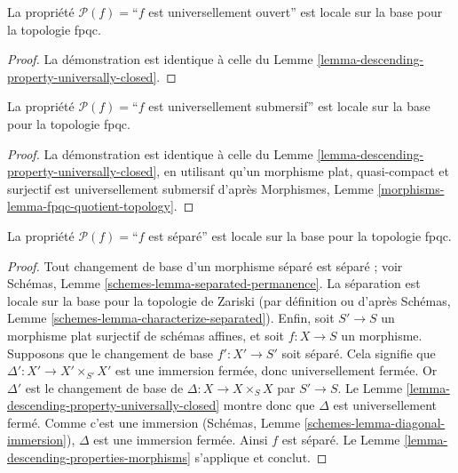 \begin{lemma}
\label{lemma-descending-property-universally-open}
La propriété $\mathcal{P}(f) =$``$f$ est universellement ouvert'' est locale
sur la base pour la topologie fpqc.
\end{lemma}

\begin{proof}
La démonstration est identique à celle du
Lemme \ref{lemma-descending-property-universally-closed}.
\end{proof}

\begin{lemma}
\label{lemma-descending-property-universally-submersive}
La propriété $\mathcal{P}(f) =$``$f$ est universellement submersif'' est
locale sur la base pour la topologie fpqc.
\end{lemma}

\begin{proof}
La démonstration est identique à celle du
Lemme \ref{lemma-descending-property-universally-closed}, en utilisant qu'un
morphisme plat, quasi-compact et surjectif est universellement submersif
d'après Morphismes, Lemme \ref{morphisms-lemma-fpqc-quotient-topology}.
\end{proof}

\begin{lemma}
\label{lemma-descending-property-separated}
La propriété $\mathcal{P}(f) =$``$f$ est séparé'' est locale sur la base pour
la topologie fpqc.
\end{lemma}

\begin{proof}
Tout changement de base d'un morphisme séparé est séparé ; voir Schémas,
Lemme \ref{schemes-lemma-separated-permanence}. La séparation est locale sur
la base pour la topologie de Zariski (par définition ou d'après Schémas,
Lemme \ref{schemes-lemma-characterize-separated}). Enfin, soit $S' \to S$ un
morphisme plat surjectif de schémas affines, et soit $f : X \to S$ un
morphisme. Supposons que le changement de base $f' : X' \to S'$ soit séparé.
Cela signifie que $\Delta' : X' \to X'\times_{S'} X'$ est une immersion
fermée, donc universellement fermée. Or $\Delta'$ est le changement de base
de $\Delta : X \to X \times_S X$ par $S' \to S$. Le
Lemme \ref{lemma-descending-property-universally-closed} montre donc que
$\Delta$ est universellement fermé. Comme c'est une immersion (Schémas,
Lemme \ref{schemes-lemma-diagonal-immersion}), $\Delta$ est une immersion
fermée. Ainsi $f$ est séparé. Le
Lemme \ref{lemma-descending-properties-morphisms} s'applique et conclut.
\end{proof}

